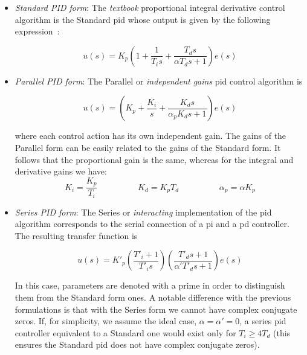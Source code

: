 \begin{itemize}
\item \emph{Standard PID form}: The \emph{textbook} proportional integral derivative control algorithm is the Standard \gls{pid} whose output is given by the following expression~\citep{astromhagglund1995}:

\begin{equation}
    u(s)= K_p \left( 1 + \frac{1}{T_i s} + \frac{T_d s}{\alpha T_d s+1} \right ) e(s)
    \label{eq:PIDstandard}
\end{equation}

\item \emph{Parallel PID form}: The Parallel or \emph{independent gains} \gls{pid} control algorithm is

\begin{equation}
	u(s) =  \left( K_p + \frac{K_i}{s}+ \frac{K_d s}{\alpha_p K_d s+1}\right) e(s)
\end{equation}

\noindent where each control action has its own independent gain. The gains of the Parallel form can be easily related to the gains of the Standard form. It follows that the proportional gain is the same, whereas for the integral and derivative gains we have:
%
\begin{equation}
K_i=\frac{K_p}{T_i} \hspace{2cm}  K_d=K_pT_d \hspace{2cm} \alpha_p = \alpha K_p
\end{equation} 
%
\item \emph{Series PID form}: The  Series or \emph{interacting} implementation of the \gls{pid} algorithm corresponds to the serial connection of a \gls{pi} and a \gls{pd} controller. The resulting transfer function is

\begin{equation}
	u(s) = K'_p \left( \frac{T'_i+1}{T'_i s}\right) \left(\frac{T'_d s + 1}{\alpha' T'_d s +1}\right)e(s)
\end{equation}

In this case, parameters are denoted with a prime in order to distinguish them from the Standard form ones. A notable difference with the previous formulations is that with the Series form we cannot have complex conjugate zeros. If, for simplicity, we assume the ideal case, $\alpha=\alpha'=0$, a series \gls{pid} controller equivalent to a Standard one would exist only for $T_i \ge 4 T_d$ (this ensures the Standard \gls{pid} does not have complex conjugate zeros).


\end{itemize}

